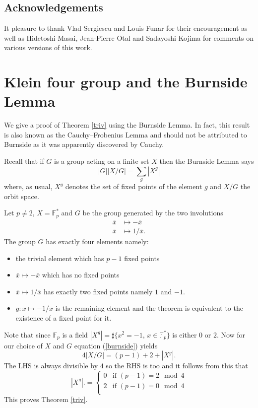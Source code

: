 \documentclass[12pt,a4paper]{amsart}
\def\fp{\mathbb{F}_p}
\begin{document}
\subsection{Acknowledgements}

It pleasure to thank Vlad Sergiescu and Louis Funar for their
encouragement as well as Hidetoshi Masai, Jean-Pierre Otal and
Sadayoshi Kojima for comments on various versions of this work.


\section{Klein four group and the Burnside Lemma}
\label{burnside for triv}

We give a proof of Theorem \ref{triv} using the Burnside Lemma.
In fact, this result is also known as the Cauchy–Frobenius Lemma and should not be attributed to Burnside as it was
apparently discovered by Cauchy.


Recall that if $G$ is  a group acting on a finite set $X$ then the Burnside Lemma says
\begin{equation}\label{burnside}
|G| |X/G| = \sum_{g} |X^g| 
\end{equation}  
where, as usual, 
 $X^g$ denotes the set of fixed points of the element $g$ 
 and $X/G$  the orbit space.

Let $p\neq 2$,  $X = \fp^*$ and $G$ be the group generated by the two involutions
\begin{eqnarray*}
	\bar{x} & \mapsto -\bar{x} \\
	\bar{x} & \mapsto 1/\bar{x}.
\end{eqnarray*}
The group  $G$ has exactly four elements namely:
\begin{itemize}
\item the trivial element which has  $p-1$ fixed points
\item $\bar{x} \mapsto -\bar{x}$ which has no fixed points 
\item  $\bar{x}\mapsto 1/\bar{x}$ has exactly two fixed points namely $1$ and $-1$.
\item  $g:\bar{x} \mapsto -1/ \bar{x}$ is the remaining element and the theorem is equivalent to the existence of a fixed point for it.
\end{itemize}
Note that since $\fp$ is a field 
$|X^g| = \sharp \{x^2 = -1, \, x\in \fp^* \}$
is either $0$ or $2$.
Now for our choice of $X$ and $G$ equation (\ref{burnside}) yields
\begin{equation}
4 |X/G|   = (p-1) + 2 + |X^g|.
\end{equation}  
The LHS is always divisible by $4$ so the  RHS is too and
it follows from this that
$$ |X^g|. = \left\{  \begin{array}{ll}
		0 & \text{if }(p-1) =  2 \mod 4 \\
2 & \text{if }(p-1) =  0 \mod 4 \\
\end{array}
\right.
$$
This proves Theorem \ref{triv}.
\end{document}
